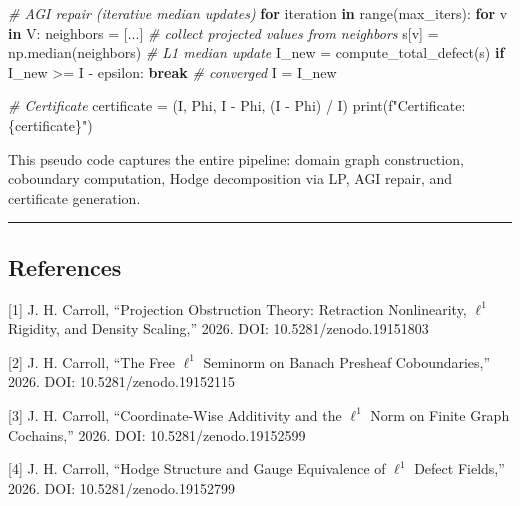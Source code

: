 \documentclass[
]{article}
\newenvironment{Shaded}{}{}
\newcommand{\BuiltInTok}[1]{\textcolor[rgb]{0.00,0.50,0.00}{#1}}
\newcommand{\CommentTok}[1]{\textcolor[rgb]{0.38,0.63,0.69}{\textit{#1}}}
\newcommand{\ControlFlowTok}[1]{\textcolor[rgb]{0.00,0.44,0.13}{\textbf{#1}}}
\newcommand{\KeywordTok}[1]{\textcolor[rgb]{0.00,0.44,0.13}{\textbf{#1}}}
\newcommand{\NormalTok}[1]{#1}
\newcommand{\OperatorTok}[1]{\textcolor[rgb]{0.40,0.40,0.40}{#1}}
\newcommand{\SpecialCharTok}[1]{\textcolor[rgb]{0.25,0.44,0.63}{#1}}
\newcommand{\SpecialStringTok}[1]{\textcolor[rgb]{0.73,0.40,0.53}{#1}}
\begin{document}
\begin{Shaded}
\begin{Highlighting}[]
\CommentTok{\# AGI repair (iterative median updates)}
\ControlFlowTok{for}\NormalTok{ iteration }\KeywordTok{in} \BuiltInTok{range}\NormalTok{(max\_iters):}
    \ControlFlowTok{for}\NormalTok{ v }\KeywordTok{in}\NormalTok{ V:}
\NormalTok{        neighbors }\OperatorTok{=}\NormalTok{ [...]  }\CommentTok{\# collect projected values from neighbors}
\NormalTok{        s[v] }\OperatorTok{=}\NormalTok{ np.median(neighbors)  }\CommentTok{\# L1 median update}
\NormalTok{    I\_new }\OperatorTok{=}\NormalTok{ compute\_total\_defect(s)}
    \ControlFlowTok{if}\NormalTok{ I\_new }\OperatorTok{\textgreater{}=}\NormalTok{ I }\OperatorTok{{-}}\NormalTok{ epsilon:}
        \ControlFlowTok{break}  \CommentTok{\# converged}
\NormalTok{    I }\OperatorTok{=}\NormalTok{ I\_new}

\CommentTok{\# Certificate}
\NormalTok{certificate }\OperatorTok{=}\NormalTok{ (I, Phi, I }\OperatorTok{{-}}\NormalTok{ Phi, (I }\OperatorTok{{-}}\NormalTok{ Phi) }\OperatorTok{/}\NormalTok{ I)}
\BuiltInTok{print}\NormalTok{(}\SpecialStringTok{f"Certificate: }\SpecialCharTok{\{}\NormalTok{certificate}\SpecialCharTok{\}}\SpecialStringTok{"}\NormalTok{)}
\end{Highlighting}
\end{Shaded}

This pseudo code captures the entire pipeline: domain graph
construction, coboundary computation, Hodge decomposition via LP, AGI
repair, and certificate generation.

\begin{center}\rule{0.5\linewidth}{0.5pt}\end{center}

\subsection{References}\label{references}

{[}1{]} J. H. Carroll, ``Projection Obstruction Theory: Retraction
Nonlinearity, \(\ell^1\) Rigidity, and Density Scaling,'' 2026. DOI:
10.5281/zenodo.19151803

{[}2{]} J. H. Carroll, ``The Free \(\ell^1\) Seminorm on Banach Presheaf
Coboundaries,'' 2026. DOI: 10.5281/zenodo.19152115

{[}3{]} J. H. Carroll, ``Coordinate-Wise Additivity and the \(\ell^1\)
Norm on Finite Graph Cochains,'' 2026. DOI: 10.5281/zenodo.19152599

{[}4{]} J. H. Carroll, ``Hodge Structure and Gauge Equivalence of
\(\ell^1\) Defect Fields,'' 2026. DOI: 10.5281/zenodo.19152799
\end{document}
